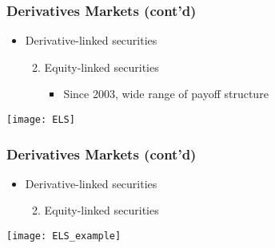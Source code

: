 \documentclass[10pt]{beamer}
\begin{document}
	
	
	\begin{frame}
		\frametitle{Derivatives Markets (cont'd)}
		
		\begin{itemize}
			
			\item Derivative-linked securities
			\begin{enumerate} \setcounter{enumi}{1}
				\item Equity-linked securities
				\begin{itemize}
					\item Since 2003, wide range of payoff structure
				\end{itemize} 	
			\end{enumerate}
			
		\end{itemize}
		
		\begin{center}
			\texttt{[image: ELS]} 		
		\end{center}	
		
	\end{frame}
	
	
	\begin{frame}
		\frametitle{Derivatives Markets (cont'd)}
		
		\begin{itemize}
			
			\item Derivative-linked securities
			\begin{enumerate} \setcounter{enumi}{1}
				\item Equity-linked securities
				
			\end{enumerate}
			
		\end{itemize}
		
		\begin{center}
			\texttt{[image: ELS\_example]} 
		\end{center}	
		
	\end{frame}
	
	
	
\end{document}
